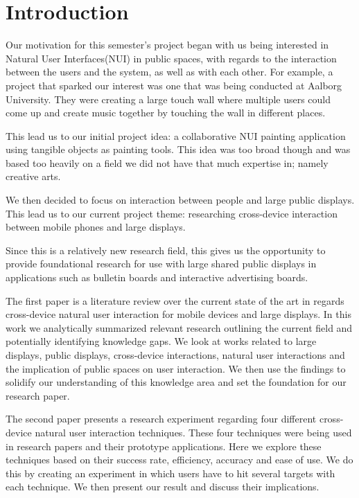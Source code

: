 \section*{Introduction}

Our motivation for this semester's project began with us being interested in Natural User Interfaces(NUI) in public spaces, with regards to the interaction between the users and the system, as well as with each other.
For example, a project that sparked our interest was one that was being conducted at Aalborg University. 
They were creating a large touch wall where multiple users could come up and create music together by touching the wall in different places. 

This lead us to our initial project idea: a collaborative NUI painting application using tangible objects as painting tools. This idea was too broad though and was based too heavily on a field we did not have that much expertise in; namely creative arts. 

We then decided to focus on interaction between people and large public displays. This lead us to our current project theme: researching cross-device interaction between mobile phones and large displays. 

Since this is a relatively new research field, this gives us the opportunity to provide foundational research for use with large shared public displays in applications such as bulletin boards and interactive advertising boards.

The first paper is a literature review over the current state of the art in regards cross-device natural user interaction for mobile devices and large displays. In this work we analytically summarized relevant research outlining the current field and potentially identifying knowledge gaps. We look at works related to large displays, public displays, cross-device interactions, natural user interactions and the implication of public spaces on user interaction. We then use the findings to solidify our understanding of this knowledge area and set the foundation for our research paper.  

The second paper presents a research experiment regarding four different cross-device natural user interaction techniques. These four techniques were being used in research papers and their prototype applications. Here we explore these techniques based on their success rate, efficiency, accuracy and ease of use. We do this by creating an experiment in which users have to hit several targets with each technique. We then present our result and discuss their implications.